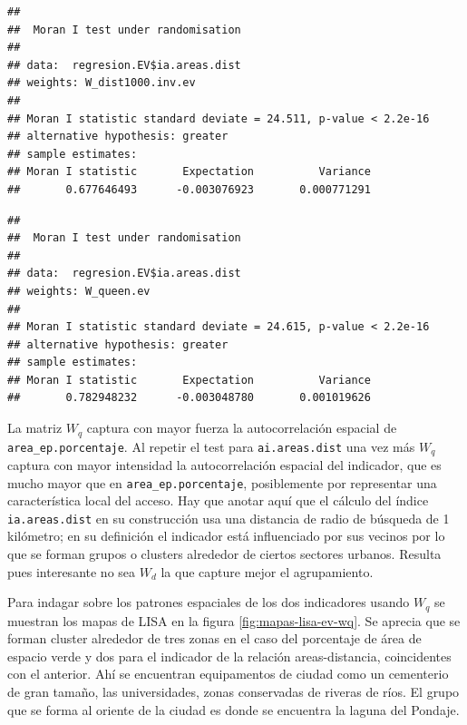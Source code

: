 \documentclass[12pt,]{book}
\newenvironment{Shaded}{\begin{snugshade}}{\end{snugshade}}
\newcommand{\KeywordTok}[1]{\textcolor[rgb]{0.13,0.29,0.53}{\textbf{#1}}}
\newcommand{\DataTypeTok}[1]{\textcolor[rgb]{0.13,0.29,0.53}{#1}}
\newcommand{\OperatorTok}[1]{\textcolor[rgb]{0.81,0.36,0.00}{\textbf{#1}}}
\newcommand{\NormalTok}[1]{#1}
\begin{document}
\begin{verbatim}
## 
##  Moran I test under randomisation
## 
## data:  regresion.EV$ia.areas.dist  
## weights: W_dist1000.inv.ev  
## 
## Moran I statistic standard deviate = 24.511, p-value < 2.2e-16
## alternative hypothesis: greater
## sample estimates:
## Moran I statistic       Expectation          Variance 
##       0.677646493      -0.003076923       0.000771291
\end{verbatim}

\begin{Shaded}
\end{Shaded}

\begin{verbatim}
## 
##  Moran I test under randomisation
## 
## data:  regresion.EV$ia.areas.dist  
## weights: W_queen.ev  
## 
## Moran I statistic standard deviate = 24.615, p-value < 2.2e-16
## alternative hypothesis: greater
## sample estimates:
## Moran I statistic       Expectation          Variance 
##       0.782948232      -0.003048780       0.001019626
\end{verbatim}

La matriz \(W_q\) captura con mayor fuerza la autocorrelación espacial
de \texttt{area\_ep.porcentaje}. Al repetir el test para
\texttt{ai.areas.dist} una vez más \(W_q\) captura con mayor intensidad
la autocorrelación espacial del indicador, que es mucho mayor que en
\texttt{area\_ep.porcentaje}, posiblemente por representar una
característica local del acceso. Hay que anotar aquí que el cálculo del
índice \texttt{ia.areas.dist} en su construcción usa una distancia de
radio de búsqueda de 1 kilómetro; en su definición el indicador está
influenciado por sus vecinos por lo que se forman grupos o clusters
alrededor de ciertos sectores urbanos. Resulta pues interesante no sea
\(W_d\) la que capture mejor el agrupamiento.

Para indagar sobre los patrones espaciales de los dos indicadores usando
\(W_q\) se muestran los mapas de LISA en la figura
\ref{fig:mapas-lisa-ev-wq}. Se aprecia que se forman cluster alrededor
de tres zonas en el caso del porcentaje de área de espacio verde y dos
para el indicador de la relación areas-distancia, coincidentes con el
anterior. Ahí se encuentran equipamentos de ciudad como un cementerio de
gran tamaño, las universidades, zonas conservadas de riveras de ríos. El
grupo que se forma al oriente de la ciudad es donde se encuentra la
laguna del Pondaje.
\end{document}
